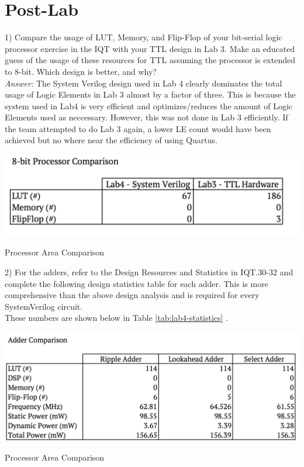 \documentclass[journal, twocolumn, final,11pt,letterpaper]{IEEEtran}
\begin{document}
\section{Post-Lab}
1) Compare the usage of LUT, Memory, and Flip-Flop of your bit-serial logic processor
exercise in the IQT with your TTL design in Lab 3. Make an educated guess of the usage of
these resources for TTL assuming the processor is extended to 8-bit. Which design is better, and
why? \\

\textit{Answer:} The System Verilog design used in Lab 4 clearly dominates the total usage of Logic Elements in Lab 3 almost by a factor of three. This is because the system used in Lab4 is very efficient and optimizes/reduces the amount of Logic Elements used as neccessary. However, this was not done in Lab 3 efficiently. If the team attempted to do Lab 3 again, a lower LE count would have been achieved but no where near the efficiency of using Quartus.
\begin{table} [H]
	\centering
	\includegraphics[scale=0.35]{processor-comparison.png}
	\caption{Processor Area Comparison\label{tab:processor-comparison}}
\end{table}

2) For the adders, refer to the Design Resources and Statistics in IQT.30-32 and complete
the following design statistics table for each adder. This is more comprehensive than the above
design analysis and is required for every SystemVerilog circuit.\\

These numbers are shown below in Table \ref{tab:lab4-statistics} .

\begin{table} [H]
	\centering
	\includegraphics[scale=0.35]{lab4-statistics.png}
	\caption{Processor Area Comparison\label{tab:lab4-statistics}}
\end{table}
\end{document}
